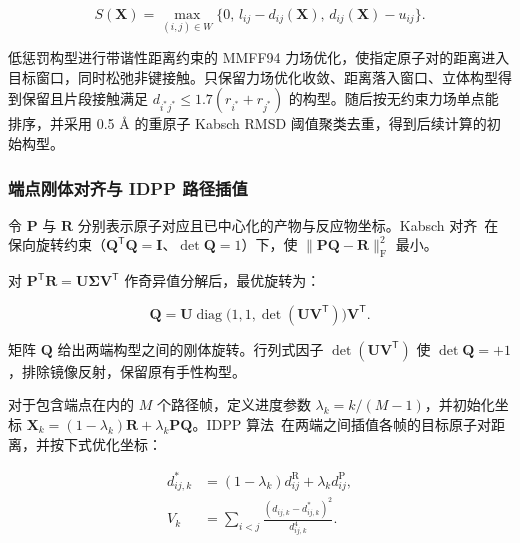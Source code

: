\begin{equation}\label{eq:methods-06}
S(\mathbf{X})=\max_{(i,j)\in W}\{0,\,l_{ij}-d_{ij}(\mathbf{X}),\,d_{ij}(\mathbf{X})-u_{ij}\}.
\end{equation}

低惩罚构型进行带谐性距离约束的 MMFF94 力场优化\citep{mmff941996}，使指定原子对的距离进入目标窗口，同时松弛非键接触。只保留力场优化收敛、距离落入窗口、立体构型得到保留且片段接触满足 $d_{i^*j^*}\le 1.7(r_{i^*}+r_{j^*})$ 的构型。随后按无约束力场单点能排序，并采用 0.5 Å 的重原子 Kabsch RMSD 阈值聚类去重，得到后续计算的初始构型。

\subsubsection{端点刚体对齐与 IDPP 路径插值}
令 $\mathbf{P}$ 与 $\mathbf{R}$ 分别表示原子对应且已中心化的产物与反应物坐标。Kabsch 对齐\citep{ref07}\ 在保向旋转约束（\mbox{$\mathbf{Q}^{\mathsf{T}}\mathbf{Q}=\mathbf{I}$}、\mbox{$\det\mathbf{Q}=1$}）下，使 $\|\mathbf{P}\mathbf{Q}-\mathbf{R}\|_{\mathrm{F}}^2$ 最小。

\begin{samepage}
对 $\mathbf{P}^{\mathsf{T}}\mathbf{R}=\mathbf{U}\boldsymbol{\Sigma}\mathbf{V}^{\mathsf{T}}$ 作奇异值分解后，最优旋转为：

\begin{equation}\label{eq:methods-07}
\mathbf{Q}=\mathbf{U}\operatorname{diag}\!\bigl(1,1,\det(\mathbf{U}\mathbf{V}^{\mathsf{T}})\bigr)\mathbf{V}^{\mathsf{T}}.
\end{equation}
\end{samepage}

矩阵 $\mathbf{Q}$ 给出两端构型之间的刚体旋转。行列式因子 $\det(\mathbf{U}\mathbf{V}^{\mathsf{T}})$ 使 $\det\mathbf{Q}=+1$，排除镜像反射，保留原有手性构型。

对于包含端点在内的 $M$ 个路径帧，定义进度参数 $\lambda_k=k/(M-1)$，并初始化坐标 $\mathbf{X}_k=(1-\lambda_k)\mathbf{R}+\lambda_k\mathbf{P}\mathbf{Q}$。IDPP 算法\citep{ref08}\ 在两端之间插值各帧的目标原子对距离，并按下式优化坐标：

\begin{equation}\label{eq:methods-08}
\begin{aligned}
d_{ij,k}^*&=(1-\lambda_k)d_{ij}^{\mathrm{R}}+\lambda_k d_{ij}^{\mathrm{P}},\\
V_k&=\sum_{i<j}\frac{(d_{ij,k}-d_{ij,k}^*)^2}{d_{ij,k}^4}.
\end{aligned}
\end{equation}


